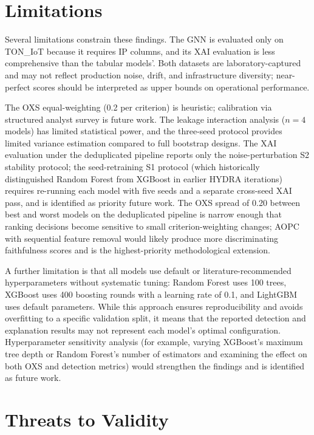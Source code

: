\documentclass[12pt,a4paper]{report}
\begin{document}
\section{Limitations}
\label{sec:limitations}

Several limitations constrain these findings. The GNN is evaluated only on TON\_IoT because it requires IP columns, and its XAI evaluation is less comprehensive than the tabular models'. Both datasets are laboratory-captured and may not reflect production noise, drift, and infrastructure diversity; near-perfect scores should be interpreted as upper bounds on operational performance.

The OXS equal-weighting (0.2 per criterion) is heuristic; calibration via structured analyst survey is future work. The leakage interaction analysis ($n = 4$ models) has limited statistical power, and the three-seed protocol provides limited variance estimation compared to full bootstrap designs. The XAI evaluation under the deduplicated pipeline reports only the noise-perturbation S2 stability protocol; the seed-retraining S1 protocol (which historically distinguished Random Forest from XGBoost in earlier HYDRA iterations) requires re-running each model with five seeds and a separate cross-seed XAI pass, and is identified as priority future work. The OXS spread of 0.20 between best and worst models on the deduplicated pipeline is narrow enough that ranking decisions become sensitive to small criterion-weighting changes; AOPC with sequential feature removal would likely produce more discriminating faithfulness scores and is the highest-priority methodological extension.

A further limitation is that all models use default or literature-recommended hyperparameters without systematic tuning: Random Forest uses 100 trees, XGBoost uses 400 boosting rounds with a learning rate of 0.1, and LightGBM uses default parameters. While this approach ensures reproducibility and avoids overfitting to a specific validation split, it means that the reported detection and explanation results may not represent each model's optimal configuration. Hyperparameter sensitivity analysis (for example, varying XGBoost's maximum tree depth or Random Forest's number of estimators and examining the effect on both OXS and detection metrics) would strengthen the findings and is identified as future work.

\section{Threats to Validity}
\label{sec:threats}
\end{document}

